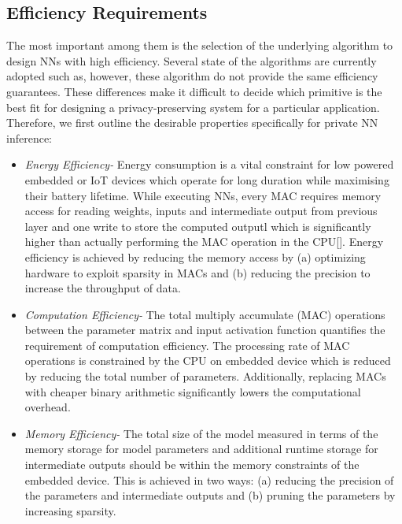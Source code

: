 \subsection{Efficiency Requirements}

The most important among them is the selection of the underlying algorithm to design NNs with high efficiency.
Several state of the algorithms are currently adopted such as, however, these algorithm do not provide the same efficiency guarantees.
These differences make it difficult to decide which primitive is the best fit for designing a privacy-preserving system for a particular application.
Therefore, we first outline the desirable properties specifically for private NN inference:

\begin{itemize}[leftmargin=*]
\item {\em Energy Efficiency-} Energy consumption is a vital constraint for low powered embedded or IoT devices which operate for long duration while maximising their battery lifetime.
While executing NNs, every MAC requires memory access for reading weights, inputs and intermediate output from previous layer and one write to store the computed outputl which is significantly higher than actually performing the MAC operation in the CPU[].
Energy efficiency is achieved by reducing the memory access by (a) optimizing hardware to exploit sparsity in MACs and (b) reducing the precision to increase the throughput of data.

\item {\em Computation Efficiency-} The total multiply accumulate (MAC) operations between the parameter matrix and input activation function quantifies the requirement of computation efficiency.
The processing rate of MAC operations is constrained by the CPU on embedded device which is reduced by reducing the total number of parameters.
Additionally, replacing MACs with cheaper binary arithmetic significantly lowers the computational overhead.

\item {\em Memory Efficiency-} The total size of the model measured in terms of the memory storage for model parameters and additional runtime storage for intermediate outputs should be within the memory constraints of the embedded device.
This is achieved in two ways: (a) reducing the precision of the parameters and intermediate outputs and (b) pruning the parameters by increasing sparsity.
\end{itemize}





